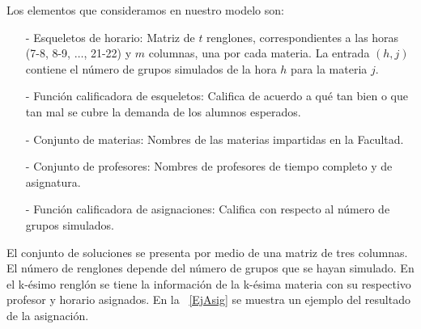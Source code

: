 Los elementos que consideramos en nuestro modelo son:
  
\begin{itemize}
\item[-] Esqueletos de horario: Matriz de $t$ renglones, correspondientes a las horas (7-8, 8-9, $\ldots$, 21-22) y $m$ columnas, una por cada materia. La entrada $(h,j)$ contiene el número de grupos simulados de la hora $h$ para la materia $j$.

\item[-] Función calificadora de esqueletos: Califica de acuerdo a qué tan bien o que tan mal se cubre la demanda de los alumnos esperados.

\item[-] Conjunto de materias: Nombres de las materias impartidas en la Facultad.

\item[-] Conjunto de profesores: Nombres de profesores de tiempo completo y de asignatura.

\item[-] Función calificadora de asignaciones: Califica con respecto al número de grupos simulados.
\end{itemize}

El conjunto de soluciones se presenta por medio de una matriz de tres columnas. El número de renglones depende del número de grupos que se hayan simulado. En el k-ésimo renglón se tiene la información de la k-ésima materia con su respectivo profesor y horario asignados. En la \tablename{~\ref{EjAsig}} se muestra un ejemplo del resultado de la asignación.

\begin{table}[H]
\centering
{}
\caption[\textit{Ejemplo de asignación}]{\textit{Se muestra un ejemplo de una asignación. La matriz tiene 3 columnas (Materia, Profesor, Horario).}}\label{EjAsig}
\end{table}




